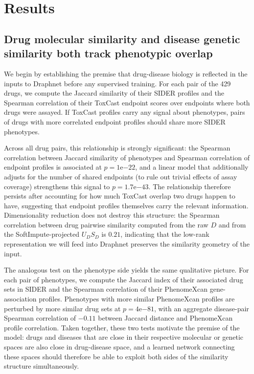 \documentclass[11pt]{article}
\begin{document}
\section{Results}

\subsection{Drug molecular similarity and disease genetic similarity both
track phenotypic overlap}

We begin by establishing the premise that drug-disease biology is
reflected in the inputs to Draphnet before any supervised training. For
each pair of the 429 drugs, we compute the Jaccard similarity of their
SIDER profiles and the Spearman correlation of their ToxCast endpoint
scores over endpoints where both drugs were assayed. If ToxCast
profiles carry any signal about phenotypes, pairs of drugs with more
correlated endpoint profiles should share more SIDER phenotypes.

Across all drug pairs, this relationship is strongly significant: the
Spearman correlation between Jaccard similarity of phenotypes and
Spearman correlation of endpoint profiles is associated at
$p=1\mathrm{e}{-22}$, and a linear model that additionally adjusts for
the number of shared endpoints (to rule out trivial effects of assay
coverage) strengthens this signal to $p=1.7\mathrm{e}{-43}$. The
relationship therefore persists after accounting for how much ToxCast
overlap two drugs happen to have, suggesting that endpoint profiles
themselves carry the relevant information. Dimensionality reduction
does not destroy this structure: the Spearman correlation between drug
pairwise similarity computed from the raw $D$ and from the
SoftImpute-projected $U_D S_D$ is $0.21$, indicating that the
low-rank representation we will feed into Draphnet preserves the
similarity geometry of the input.

The analogous test on the phenotype side yields the same qualitative
picture. For each pair of phenotypes, we compute the Jaccard index of
their associated drug sets in SIDER and the Spearman correlation of
their PhenomeXcan gene-association profiles. Phenotypes with more
similar PhenomeXcan profiles are perturbed by more similar drug sets at
$p=4\mathrm{e}{-81}$, with an aggregate disease-pair Spearman
correlation of $-0.11$ between Jaccard distance and PhenomeXcan profile
correlation. Taken together, these two tests motivate the premise of
the model: drugs and diseases that are close in their respective
molecular or genetic spaces are also close in drug-disease space, and a
learned network connecting these spaces should therefore be able to
exploit both sides of the similarity structure simultaneously.
\end{document}
